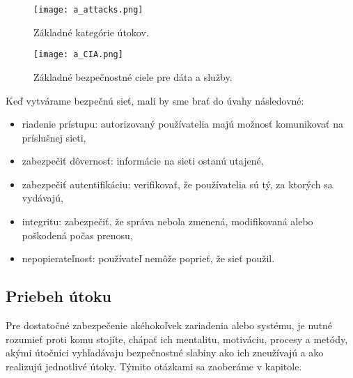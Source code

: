 \documentclass[12pt,a4wide,oneside,openright]{report}
\begin{document}
\begin{figure*}[h]
	\centering
	\texttt{[image: a\_attacks.png]}
	\caption{Základné kategórie útokov. \cite{StallingsCryptographyandnetworksecurity}}
	\label{f:o_attacks}
\end{figure*}

\begin{figure*}[h]
	\centering
	\texttt{[image: a\_CIA.png]}
	\caption{Základné bezpečnostné ciele pre dáta a služby.\cite{StallingsCryptographyandnetworksecurity}}
	\label{f:o_cia}
\end{figure*}

Keď vytvárame bezpečnú sieť, mali by sme brať do úvahy následovné\cite{bidgoli2006handbook}:
\singlespacing
\begin{itemize}
\item riadenie prístupu: autorizovaný používatelia majú možnosť komunikovať na príslušnej sieti, 
\item zabezpečiť dôvernosť: informácie na sieti ostanú utajené, 
\item zabezpečiť autentifikáciu: verifikovať, že používatelia sú tý, za ktorých sa vydávajú,
\item integritu: zabezpečiť, že správa nebola zmenená, modifikovaná alebo poškodená počas prenosu,
\item nepopierateľnosť: používateľ nemôže poprieť, že sieť použil.
\end{itemize}
\onehalfspacing

%


\subsection{Priebeh útoku} \label{s_attack}
Pre dostatočné zabezpečenie akéhokoľvek zariadenia alebo systému, je nutné rozumieť proti komu stojíte, chápať ich mentalitu, motiváciu, procesy a metódy, akými útočníci vyhľadávaju bezpečnostné slabiny ako ich zneužívajú a ako realizujú jednotlivé útoky. Týmito otázkami sa zaoberáme v kapitole.
\end{document}
